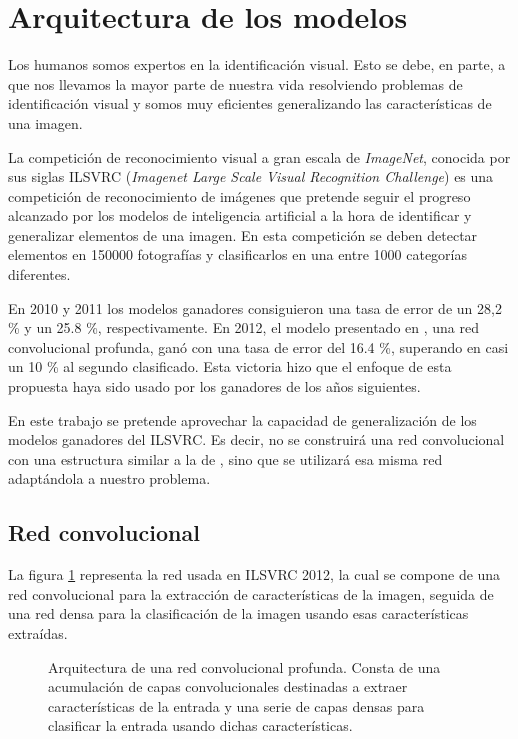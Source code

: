 \section{Arquitectura de los modelos}

Los humanos somos expertos en la identificación visual. Esto se debe, en
parte, a que nos llevamos la mayor parte de nuestra vida resolviendo problemas
de identificación visual y somos muy eficientes generalizando las
características de una imagen.

La competición de reconocimiento visual a gran escala de \textit{ImageNet},
conocida por sus siglas ILSVRC (\textit{Imagenet Large Scale Visual Recognition
Challenge}) \parencite{ILSVRC} es una competición de reconocimiento de imágenes
que pretende seguir el progreso alcanzado por los modelos de inteligencia
artificial a la hora de identificar y generalizar elementos de una imagen. En
esta competición se deben detectar elementos en 150000 fotografías y
clasificarlos en una entre 1000 categorías diferentes.

En 2010 y 2011 los modelos ganadores consiguieron una tasa de error de un 28,2 \% y un 25.8 \%, respectivamente. En 2012, el modelo presentado en \parencite{krizhevsky2012imagenet}, una red convolucional profunda, ganó con una tasa de error del 16.4 \%, superando en casi un 10 \% al segundo clasificado. Esta victoria hizo que el enfoque de esta propuesta haya sido usado por los ganadores de los años siguientes.

En este trabajo se pretende aprovechar la capacidad de generalización de los modelos ganadores del ILSVRC. Es decir, no se construirá una red convolucional con una estructura similar a la de \parencite{krizhevsky2012imagenet}, sino que se utilizará esa misma red adaptándola a nuestro problema.

\subsection{Red convolucional}

La figura \ref{general-architecture} representa la red usada en ILSVRC 2012, la
cual se compone de una red convolucional para la extracción de características
de la imagen, seguida de una red densa para la clasificación de la imagen
usando esas características extraídas.

\begin{figure}
  \caption{Arquitectura de una red convolucional profunda. Consta de una acumulación de capas convolucionales destinadas a extraer características de la entrada y una serie de capas densas para clasificar la entrada usando dichas características.}
\label{general-architecture}
\end{figure}

